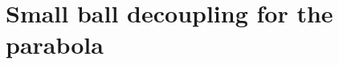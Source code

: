 \documentclass[biblatex]{pzorin-note}
\begin{document}
\setcounter{section}{2}
\section{Small ball decoupling for the parabola}
\end{document}
